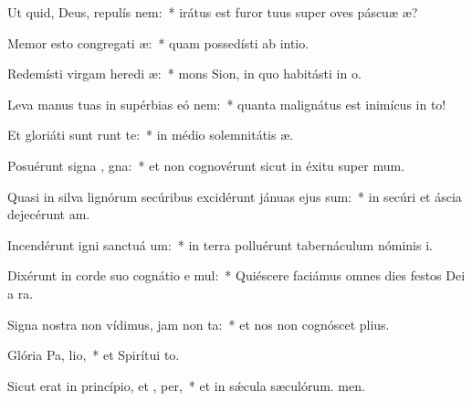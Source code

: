\item Ut quid, Deus, repulís  nem:~* irátus est furor tuus super oves páscuæ æ?
\item Memor esto congregati æ:~* quam possedísti ab intio.
\item Redemísti virgam heredi æ:~* mons Sion, in quo habitásti in o.
\item Leva manus tuas in supérbias eó  nem:~* quanta malignátus est inimícus in to!
\item Et gloriáti sunt  runt te:~* in médio solemnitátis æ.
\item Posuérunt signa , gna:~* et non cognovérunt sicut in éxitu super mum.
\item Quasi in silva lignórum secúribus excidérunt jánuas ejus  sum:~* in secúri et áscia dejecérunt am.
\item Incendérunt igni sanctuá um:~* in terra polluérunt tabernáculum nóminis i.
\item Dixérunt in corde suo cognátio e mul:~* Quiéscere faciámus omnes dies festos Dei a ra.
\item Signa nostra non vídimus, jam non  ta:~* et nos non cognóscet plius.
\item Glória Pa,  lio,~* et Spirítui to.
\item Sicut erat in princípio, et ,  per,~* et in sǽcula sæculórum. men.

